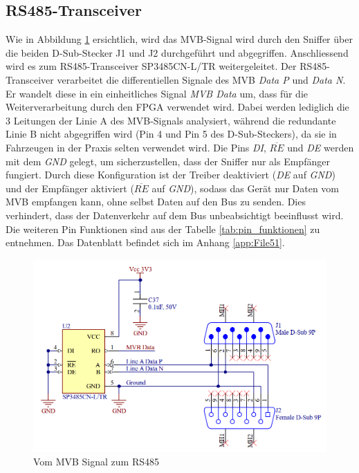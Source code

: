 \subsection{RS485-Transceiver}

Wie in Abbildung \ref{fig:MVB to RS485} ersichtlich, wird das MVB-Signal wird durch den Sniffer über die beiden D-Sub-Stecker J1 und J2 durchgeführt und abgegriffen. Anschliessend wird es zum RS485-Transceiver SP3485CN-L/TR weitergeleitet. Der RS485-Transceiver verarbeitet die differentiellen Signale des MVB \textit{Data P} und \textit{Data N}. Er wandelt diese in ein einheitliches Signal \textit{MVB Data} um, dass für die Weiterverarbeitung durch den FPGA verwendet wird. Dabei werden lediglich die 3 Leitungen der Linie A des MVB-Signals analysiert, während die redundante Linie B nicht abgegriffen wird (Pin 4 und Pin 5 des D-Sub-Steckers), da sie in Fahrzeugen in der Praxis selten verwendet wird. Die Pins \textit{DI}, $\overline{RE}$ und \textit{DE} werden mit dem \textit{GND} gelegt, um sicherzustellen, dass der Sniffer nur als Empfänger fungiert. Durch diese Konfiguration ist der Treiber deaktiviert (\textit{DE} auf \textit{GND}) und der Empfänger aktiviert ($\overline{RE}$ auf \textit{GND}), sodass das Gerät nur Daten vom MVB empfangen kann, ohne selbst Daten auf den Bus zu senden. Dies verhindert, dass der Datenverkehr auf dem Bus unbeabsichtigt beeinflusst wird. Die weiteren Pin Funktionen sind aus der Tabelle \ref{tab:pin_funktionen} zu entnehmen. Das Datenblatt befindet sich im Anhang \ref{app:File51}.

\begin{figure}[H]
    \centering
    \includegraphics[width=0.8\linewidth]{Figures/Chap3/Schematics/MVB to RS485.png}
    \caption{Vom MVB Signal zum RS485}
    \label{fig:MVB to RS485}
\end{figure}

